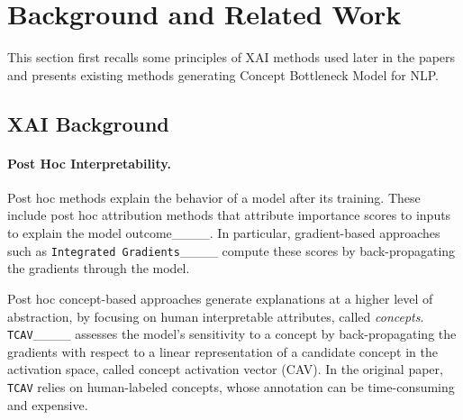\section{Background and Related Work}
\label{bk_rw}
This section first recalls some principles of XAI methods used later in the papers and presents existing methods generating Concept Bottleneck Model for NLP.


\subsection{XAI Background}
\paragraph{Post Hoc Interpretability.}
Post hoc methods explain the behavior of a model after its training. These include post hoc attribution methods that attribute importance scores to inputs to explain the model outcome____. In particular, gradient-based approaches such as \texttt{Integrated Gradients}____ compute these scores by back-propagating the gradients through the model.

Post hoc concept-based approaches generate explanations at a higher level of abstraction, by focusing on human interpretable attributes, called \emph{concepts}. %
\texttt{TCAV}____
assesses the model's sensitivity to a concept by back-propagating the gradients with respect to a linear representation of a candidate concept in the activation space, called concept activation vector (CAV). In the original paper, 
\texttt{TCAV} relies on human-labeled concepts, whose annotation can be time-consuming and expensive.  


